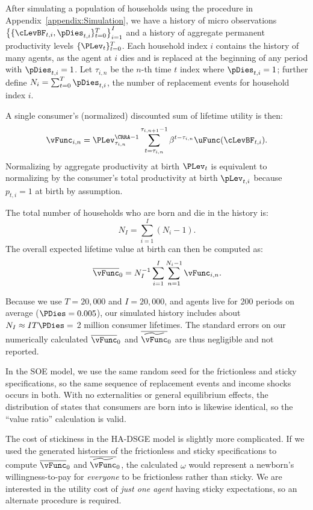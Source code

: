 
After simulating a population of households using the procedure in Appendix~\ref{appendix:Simulation},
we have a history of micro observations $\left\{ \{\cLevBF_{t,i}, \pDies_{t,i}\}_{t=0}^T \right\}_{i=1}^I$
and a history of aggregate permanent productivity levels $\{ \PLev_t \}_{t=0}^T$.  Each household index
$i$ contains the history of many agents, as the agent at $i$ dies and is replaced at the beginning of any period
with $\pDies_{t,i}=1$.  Let $\tau_{i,n}$ be the $n$-th time $t$ index where $\pDies_{t,i}=1$; further define
$N_i = \sum_{t=0}^T \pDies_{t,i}$, the number of replacement events for household index $i$.

A single consumer's (normalized) discounted sum of lifetime utility is then:
\begin{equation*}
\vFunc_{i,n} =  \PLev_{\tau_{i,n}}^{\CRRA-1} \sum_{t=\tau_{i,n}}^{\tau_{i,n+1}-1} \beta^{t-\tau_{i,n}} \uFunc(\cLevBF_{t,i}).
\end{equation*}
Normalizing by aggregate productivity at birth $\PLev_t$ is equivalent to normalizing by the consumer's
total productivity at birth $\pLev_{t,i}$ because $p_{t,i}=1$ at birth by assumption.

The total number of households who are born and die in the history is:
\begin{equation*}
N_I = \sum_{i=1}^I (N_i - 1).
\end{equation*}
The overall expected lifetime value at birth can then be computed as:
\begin{equation*}
\overline{\vFunc}_0 = N_I^{-1} \sum_{i=1}^I \sum_{n=1}^{N_i-1} \vFunc_{i,n}.
\end{equation*}

Because we use $T=20,000$ and $I=20,000$, and agents live for 200 periods on average ($\PDies = 0.005$),
our simulated history includes about $N_I \approx I T \PDies =$ 2 million consumer lifetimes.  The standard errors
on our numerically calculated $\overline{\vFunc}_0$ and $\overline{\widetilde{\vFunc}}_0$ are thus negligible
and not reported.

In the SOE model, we use the same random seed for the frictionless and sticky specifications, so
the same sequence of replacement events and income shocks occurs in both. With no externalities
or general equilibrium effects, the distribution of states that consumers are born into is likewise identical,
so the ``value ratio'' calculation is valid.

The cost of stickiness in the HA-DSGE model is slightly more complicated.  If we
used the generated histories of the frictionless and sticky specifications to compute
$\overline{\vFunc}_0$ and $\overline{\widetilde{\vFunc}}_0$, the calculated $\omega$
would represent a newborn's willingness-to-pay for \textit{everyone} to be frictionless
rather than sticky. We are interested in the utility cost of \textit{just one agent} having
sticky expectations, so an alternate procedure is required.

